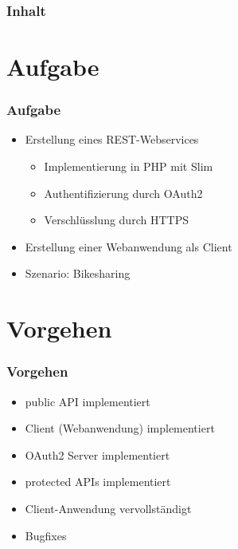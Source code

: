 \begin{frame}
	\frametitle*{Inhalt}
	\tableofcontents
\end{frame}

\section{Aufgabe}
\begin{frame}
	\frametitle*{Aufgabe}
	\begin{itemize}
		\item Erstellung eines REST-Webservices
		\begin{itemize}
			\item Implementierung in PHP mit Slim
			\item Authentifizierung durch OAuth2
			\item Verschlüsslung durch HTTPS
		\end{itemize}
		\item Erstellung einer Webanwendung als Client
		\item Szenario: Bikesharing
	\end{itemize}
\end{frame}

\section{Vorgehen}
\begin{frame}
	\frametitle*{Vorgehen}
	\begin{itemize}
		\item public API implementiert
		\item Client (Webanwendung) implementiert
		\item OAuth2 Server implementiert
		\item protected APIs implementiert
		\item Client-Anwendung vervollständigt
		\item Bugfixes
	\end{itemize}
\end{frame}

